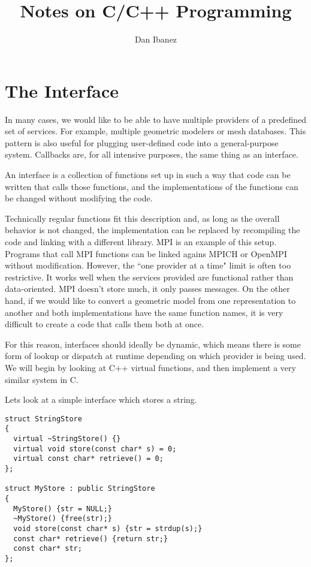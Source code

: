 \documentclass{article}
\title{Notes on C/C++ Programming}
\author{Dan Ibanez}
\begin{document}
\lstset{language=C++,style=myc}

\maketitle

\section{The Interface}

In many cases, we would like to be able to have multiple providers of a
predefined set of services.
For example, multiple geometric modelers or mesh databases.
This pattern is also useful for plugging user-defined code into a
general-purpose system.
Callbacks are, for all intensive purposes, the same thing as an interface.

An interface is a collection of functions set up in such a way that code
can be written that calls those functions, and the implementations of the
functions can be changed without modifying the code.

Technically regular functions fit this description and, as long as the overall
behavior is not changed, the implementation can be replaced by recompiling
the code and linking with a different library.
MPI is an example of this setup.
Programs that call MPI functions can be linked agains MPICH or OpenMPI
without modification.
However, the ``one provider at a time" limit is often too restrictive.
It works well when the services provided are functional rather than
data-oriented.
MPI doesn't store much, it only passes messages.
On the other hand, if we would like to convert a geometric model from
one representation to another and both implementations have the same
function names, it is very difficult to create a code that calls them
both at once.

For this reason, interfaces should ideally be dynamic, which means there
is some form of lookup or dispatch at runtime depending on which provider
is being used.
We will begin by looking at C++ virtual functions, and then implement
a very similar system in C.

Lets look at a simple interface which stores a string.

\begin{lstlisting}
struct StringStore
{
  virtual ~StringStore() {}
  virtual void store(const char* s) = 0;
  virtual const char* retrieve() = 0;
};

struct MyStore : public StringStore
{
  MyStore() {str = NULL;}
  ~MyStore() {free(str);}
  void store(const char* s) {str = strdup(s);}
  const char* retrieve() {return str;}
  const char* str;
};
\end{lstlisting}
\end{document}
